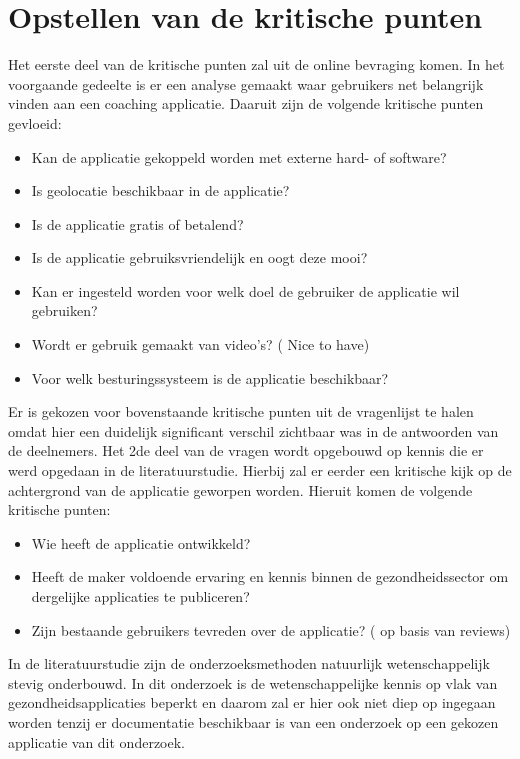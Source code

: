 \newpage
\section{Opstellen van de kritische punten}
\label{sec:kritische-punten}

Het eerste deel van de kritische punten zal uit de online bevraging komen. In het voorgaande gedeelte is er een analyse gemaakt waar gebruikers net belangrijk vinden aan een coaching applicatie. Daaruit zijn de volgende kritische punten gevloeid:

\begin{itemize}
    \item Kan de applicatie gekoppeld worden met externe hard- of software?
    \item Is geolocatie beschikbaar in de applicatie?
    \item Is de applicatie gratis of betalend?
    \item Is de applicatie gebruiksvriendelijk en oogt deze mooi?
    \item  Kan er ingesteld worden voor welk doel de gebruiker de applicatie wil gebruiken?
    \item Wordt er gebruik gemaakt van video’s? ( Nice to have) 
    \item Voor welk besturingssysteem is de applicatie beschikbaar?
\end{itemize}
Er is gekozen voor bovenstaande kritische punten uit de vragenlijst te halen omdat hier een duidelijk significant verschil zichtbaar was in de antwoorden van de deelnemers. Het 2de deel van de vragen wordt opgebouwd op kennis die er werd opgedaan in de literatuurstudie. Hierbij zal er eerder een kritische kijk op de achtergrond van de applicatie geworpen worden. Hieruit komen de volgende kritische punten:
\begin{itemize}
    \item Wie heeft de applicatie ontwikkeld?
    \item Heeft de maker voldoende ervaring en kennis binnen de gezondheidssector om dergelijke applicaties te publiceren?
    \item Zijn bestaande gebruikers tevreden over de applicatie?  ( op basis van reviews)
\end{itemize}

In de literatuurstudie zijn de onderzoeksmethoden natuurlijk wetenschappelijk stevig onderbouwd. In dit onderzoek is de wetenschappelijke kennis op vlak van gezondheidsapplicaties beperkt en daarom zal er hier ook niet diep op ingegaan worden tenzij er documentatie beschikbaar is van een onderzoek op een gekozen applicatie van dit onderzoek.

